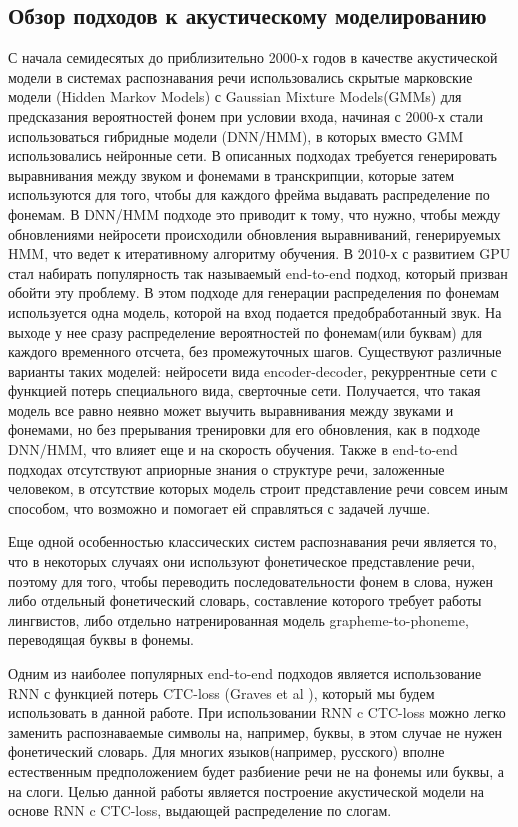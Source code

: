 \documentclass[a4paper,14pt]{extarticle}
\begin{document}
\subsection{Обзор подходов к акустическому моделированию}
С начала семидесятых до приблизительно 2000-х годов в качестве акустической модели в системах распознавания речи использовались скрытые марковские модели (Hidden Markov Models) \cite{hmm_introduction} с Gaussian Mixture Models(GMMs) для предсказания вероятностей фонем при условии входа, начиная с 2000-х стали использоваться гибридные модели (DNN/HMM), в которых вместо GMM использовались нейронные сети. В описанных подходах требуется генерировать выравнивания между звуком и фонемами в транскрипции, которые затем используются для того, чтобы для каждого фрейма выдавать распределение по фонемам. В DNN/HMM подходе это приводит к тому, что нужно, чтобы между обновлениями нейросети происходили обновления выравниваний, генерируемых HMM, что ведет к итеративному алгоритму обучения. В 2010-х с развитием GPU стал набирать популярность так называемый end-to-end подход, который призван обойти эту проблему. В этом подходе для генерации распределения по фонемам используется одна модель, которой на вход подается предобработанный звук. На выходе у нее сразу распределение вероятностей по фонемам(или буквам) для каждого временного отсчета, без промежуточных шагов. Существуют различные варианты таких моделей: нейросети вида encoder-decoder, рекуррентные сети с функцией потерь специального вида, сверточные сети. Получается, что такая модель все равно неявно может выучить выравнивания между звуками и фонемами, но без прерывания тренировки для его обновления, как в подходе DNN/HMM, что влияет еще и на скорость обучения. Также в end-to-end подходах отсутствуют априорные знания о структуре речи, заложенные человеком, в отсутствие которых модель строит представление речи совсем иным способом, что возможно и помогает ей справляться с задачей лучше.

Еще одной особенностью классических систем распознавания речи является то, что в некоторых случаях они используют фонетическое представление речи, поэтому для того, чтобы переводить последовательности фонем в слова, нужен либо отдельный фонетический словарь, составление которого требует работы лингвистов, либо отдельно натренированная модель grapheme-to-phoneme, переводящая буквы в фонемы.

Одним из наиболее популярных end-to-end подходов является использование RNN с функцией потерь CTC-loss (Graves et al \cite{graves2014towards}), который мы будем использовать в данной работе. При использовании RNN c CTC-loss можно легко заменить распознаваемые символы на, например, буквы, в этом случае не нужен фонетический словарь. Для многих языков(например, русского) вполне естественным предположением будет разбиение речи не на фонемы или буквы, а на слоги. Целью данной работы является построение акустической модели на основе RNN c CTC-loss, выдающей распределение по слогам.
\pagebreak
\end{document}
